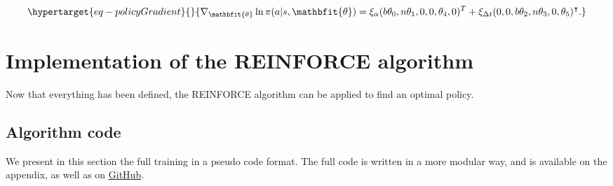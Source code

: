 \documentclass[
  letterpaper,
]{report}
\theoremstyle{plain}
\theoremstyle{definition}
\theoremstyle{definition}
\theoremstyle{remark}
\begin{document}
\begin{equation}\protect\hypertarget{eq-policyGradient}{}{
\nabla_{\mathbfit{\theta}} \ln\pi(a|s,{\mathbfit{\theta}}) =  \xi_\alpha (b\theta_0,n\theta_1,0,0,\theta_4,0)^T+ \xi_{\Delta t}(0,0,b\theta_2,n\theta_3,0,\theta_5)^\intercal.
}\label{eq-policyGradient}\end{equation}

\hypertarget{implementation-of-the-reinforce-algorithm}{%
\section{Implementation of the REINFORCE
algorithm}\label{implementation-of-the-reinforce-algorithm}}

Now that everything has been defined, the REINFORCE algorithm can be
applied to find an optimal policy.

\hypertarget{algorithm-code}{%
\subsection{Algorithm code}\label{algorithm-code}}

We present in this section the full training in a pseudo code format.
The full code is written in a more modular way, and is available on the
appendix, as well as on
\href{https://github.com/MelanieInky/ThesisBook}{GitHub}.
\end{document}
